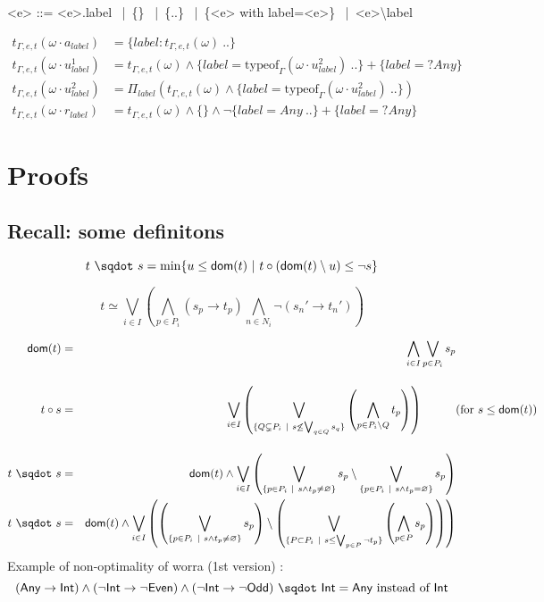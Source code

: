 \documentclass[a4paper]{article}%
\newcommand{\worra}[2]{#1\mathop{\,\sqdot\,} #2}
\newcommand{\apply}[2]{#1\circ#2}
\newcommand{\dom}[1]{\textsf{dom}(#1)}
\newcommand{\alt}{~|~}
\newcommand{\Any} {\textsf{Any}}%
\newcommand{\Int} {\textsf{Int}}
\newcommand{\Even} {\textsf{Even}}
\newcommand{\Odd} {\textsf{Odd}}
\begin{document}
    \begin{grammar}
        \let\syntleft\relax
        \let\syntright\relax
        <e> ::= <e>.label \alt \{\} \alt \{..\} \alt \{<e> with label=<e>\} \alt <e>\textbackslash label
    \end{grammar}

    \begin{align*}
        t_{\Gamma,e,t}(\omega\cdot a_{label}) &= \{ label: t_{\Gamma,e,t}(\omega) \ .. \}\\
        t_{\Gamma,e,t}(\omega\cdot u_{label}^1) &= t_{\Gamma,e,t}(\omega) \land \{label=\text{typeof}_{\Gamma}(\omega \cdot u_{label}^2) \ .. \} + \{ label =? Any \}\\
        t_{\Gamma,e,t}(\omega\cdot u_{label}^2) &= \Pi_{label}(t_{\Gamma,e,t}(\omega) \land \{label=\text{typeof}_{\Gamma}(\omega \cdot u_{label}^2) \ .. \})\\
        t_{\Gamma,e,t}(\omega\cdot r_{label}) &= t_{\Gamma,e,t}(\omega) \land \{\} \land \neg \{label=Any \ .. \} + \{ label =? Any \}
    \end{align*}

    \section{Proofs}

    \subsection{Recall: some definitons}

    \[ \worra t s = \min \{ u \leq \dom t \alt \apply t {(\dom t \setminus u)} \leq \neg s \} \]

    \[ t \simeq \bigvee_{i\in I}\left(\bigwedge_{p\in P_i}(s_p\to t_p)\bigwedge_{n\in N_i}\neg(s_n'\to t_n')\right) \]

    \begin{eqnarray*}
        \dom{t}    & = & \bigwedge_{i\in I}\bigvee_{p\in P_i}s_p\\[4mm]
        \apply t s & = & \bigvee_{i\in I}\left(\bigvee_{\{Q\subsetneq P_i\alt s\not\leq\bigvee_{q\in Q}s_q\}}\left(\bigwedge_{p\in P_i\setminus Q}t_p\right)\right)\hspace*{1cm}\makebox[0cm][l]{(for $s\leq\dom{t}$)}\\[4mm]
        \worra t s & = & \dom t \wedge\bigvee_{i\in I}\left(\bigvee_{\{p\in P_i\alt s\wedge t_p\not=\varnothing\}}s_p \setminus \bigvee_{\{p\in P_i\alt s\wedge t_p=\varnothing\}}s_p \right)\\
        \worra t s & = & \dom t \wedge\bigvee_{i\in I}\left(\left(\bigvee_{\{p\in P_i\alt s\wedge t_p\not=\varnothing\}}s_p\right) \setminus \left(\bigvee_{\{P \subset P_i\alt s \leq \bigvee_{p \in P} \neg t_p\}} \left(\bigwedge_{p \in P} s_p\right) \right)\right)
    \end{eqnarray*}
    Example of non-optimality of worra (1st version) :
    \[ \worra {(\Any \rightarrow \Int) \land (\neg \Int \rightarrow \neg \Even) \land (\neg \Int \rightarrow \neg \Odd)} \Int = \Any \text{ instead of } \Int \]
    \pagebreak
\end{document}
